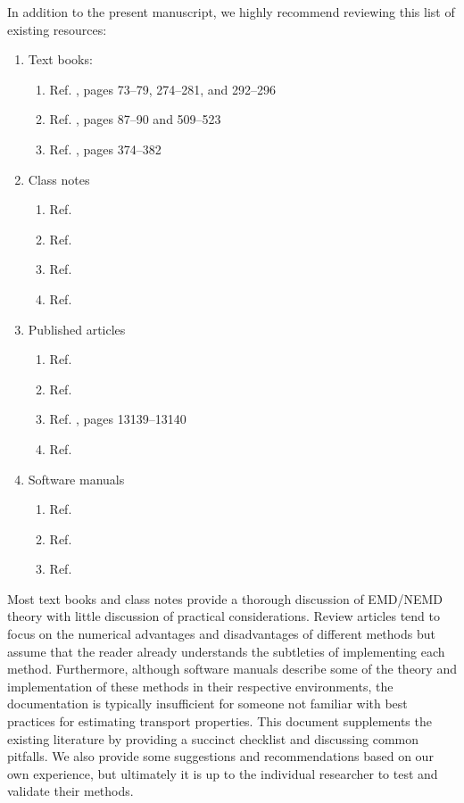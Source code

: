 \documentclass[9pt,bestpractices]{livecoms}
\begin{document}
In addition to the present manuscript, we highly recommend reviewing this list of existing resources:
\begin{enumerate}
	\item Text books:
	\begin{enumerate}
		\item Ref. \cite{Allen2017}, pages 73--79, 274--281, and 292--296
		\item Ref. \cite{Frenkel2002}, pages 87--90 and 509--523
		\item Ref. \cite{Leach2001}, pages 374--382
	\end{enumerate}
	\item Class notes
	\begin{enumerate}
		\item Ref. \cite{PanaNotes}
		\item Ref. \cite{KofkeNotes}
		\item Ref. \cite{MaginnNotes}
		\item Ref. \cite{ShellNotes}

	\end{enumerate}
	\item Published articles
	\begin{enumerate}
		\item Ref. \cite{Chen2009}
		\item Ref. \cite{Hess2002}
		\item Ref. \cite{Nieto2015}, pages 13139--13140
		\item Ref. \cite{Ungerer2007}
	\end{enumerate}
	\item Software manuals
	\begin{enumerate}
		\item Ref. \cite{GROMACS}
		\item Ref. \cite{LAMMPS}
		\item Ref. \cite{AMBER2018}
	\end{enumerate}
\end{enumerate}
Most text books and class notes provide a thorough discussion of EMD/NEMD theory with little discussion of practical considerations. Review articles tend to focus on the numerical advantages and disadvantages of different methods but assume that the reader already understands the subtleties of implementing each method. Furthermore, although software manuals describe some of the theory and implementation of these methods in their respective environments, the documentation is typically insufficient for someone not familiar with best practices for estimating transport properties. This document supplements the existing literature by providing a succinct checklist and discussing common pitfalls. We also provide some suggestions and recommendations based on our own experience, but ultimately it is up to the individual researcher to test and validate their methods.
\end{document}
